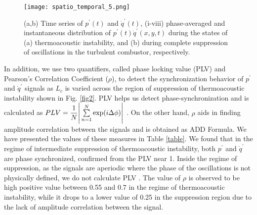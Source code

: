 \documentclass[twocolumn,10pt]{article} %
\begin{document}
\begin{figure}[t]
\centering
\texttt{[image: spatio\_temporal\_5.png]}
\caption{(a,b) Time series of $p^{\prime}(t)$ and $\dot{q}^{\prime}(t)$, (i-viii) phase-averaged and instantaneous distribution of $p^\prime(t)\dot{q}^\prime(x,y,t)$ during the states of (a) thermoacoustic instability, and (b) during complete suppression of oscillations in the turbulent combustor, respectively.}
\label{fig5}
\end{figure}


In addition, we use two quantifiers, called phase locking value (PLV) and Pearson's Correlation Coefficient ($\rho$), to detect the synchronization behavior of $p^\prime$ and $\dot{q}^\prime$ signals as $L_c$ is varied across the region of suppression of thermoacoustic instability shown in Fig. \ref{fig2}. PLV helps us detect phase-synchronization and is calculated as $PLV = \dfrac{1}{N} \Bigg{\lvert} \sum\limits_{n=1}^N \text{exp}(i \Delta \phi) \Bigg{\lvert}$ \cite{pikovsky2001universal}. On the other hand, $\rho$ aids in finding amplitude correlation between the signals \cite{gonzalez2002amplitude} and is obtained as ADD Formula. We have presented the values of these measures in Table \ref{table}. We found that in the regime of intermediate suppression of thermoacoustic instability, both $p^\prime$ and $\dot{q}^\prime$ are phase synchronized, confirmed from the PLV near 1. Inside the regime of suppression, as the signals are aperiodic where the phase of the oscillations is not physically defined, we do not calculate PLV \cite{pikovsky2001universal,sujith2021thermoacoustic}. The value of $\rho$ is observed to be high positive value between 0.55 and 0.7 in the regime of thermoacoustic instability, while it drops to a lower value of 0.25 in the suppression region due to the lack of amplitude correlation between the signal.   
\end{document}
